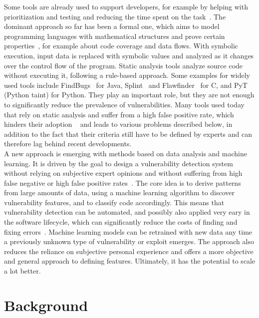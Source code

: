 \documentclass[
	a4paper,
	pagesize,
	pdftex,
	12pt,
	twoside, %
	BCOR=5mm, %
	ngerman,
	fleqn,
	final,
	]{scrartcl}
\begin{document}
Some tools are already used to support developers, for example by helping with prioritization and testing and reducing the time spent on the task~\cite{Dam.2017}. The dominant approach so far has been a formal one, which aims to model programming languages with mathematical structures and prove certain properties~\cite{Allamanis.2018}, for example about code coverage and data flows. With symbolic execution, input data is replaced with symbolic values and analyzed as it changes over the control flow of the program. Static analysis tools analyze source code without executing it, following a rule-based approach. Some examples for widely used tools include FindBugs~\cite{Hovemeyer.2004,Hovemeyer.2005} for Java, Splint~\cite{Evans.2002} and Flawfinder~\cite{Wheeler.2006} for C, and PyT~\cite{Micheelsen.2016} (Python taint) for Python. They play an important role, but they are not enough to significantly reduce the prevalence of vulnerabilities. Many tools used today that rely on static analysis and suffer from a high false positive rate, which hinders their adoption ~\cite{Liu.2018} and leads to various problems described below, in addition to the fact that their criteria still have to be defined by experts and can therefore lag behind recent developments.\\
A new approach is emerging with methods based on data analysis and machine learning. It is driven by the goal to design a vulnerability detection system without relying on subjective expert opinions and without suffering from high false negative or high false positive rates~\cite{Li.2018}. The core idea is to derive patterns from large amounts of data, using a machine learning algorithm to discover vulnerability features, and to classify code accordingly. This means that vulnerability detection can be automated, and possibly also applied very eary in the software lifecycle, which can significantly reduce the costs of finding and fixing errors~\cite{Dam.2017}. Machine learning models can be retrained with new data any time a previously unknown type of vulnerability or exploit emerges. The approach also reduces the reliance on subjective personal experience and offers a more objective and general approach to defining features. Ultimately, it has the potential to scale a lot better.


\newpage
\section{Background}
\end{document}
